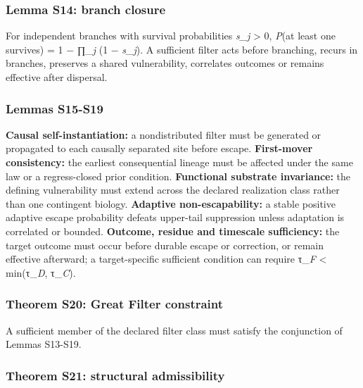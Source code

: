 \hypertarget{lemma-s14-branch-closure}{%
\subsubsection{Lemma S14: branch
closure}\label{lemma-s14-branch-closure}}

For independent branches with survival probabilities \emph{s\_j}
\textgreater{} 0, \emph{P}(at least one survives) = 1 − ∏\_\emph{j} (1 −
\emph{s\_j}). A sufficient filter acts before branching, recurs in
branches, preserves a shared vulnerability, correlates outcomes or
remains effective after dispersal.

\hypertarget{lemmas-s15-s19}{%
\subsubsection{Lemmas S15-S19}\label{lemmas-s15-s19}}

\textbf{Causal self-instantiation:} a nondistributed filter must be
generated or propagated to each causally separated site before escape.
\textbf{First-mover consistency:} the earliest consequential lineage
must be affected under the same law or a regress-closed prior condition.
\textbf{Functional substrate invariance:} the defining vulnerability
must extend across the declared realization class rather than one
contingent biology. \textbf{Adaptive non-escapability:} a stable
positive adaptive escape probability defeats upper-tail suppression
unless adaptation is correlated or bounded. \textbf{Outcome, residue and
timescale sufficiency:} the target outcome must occur before durable
escape or correction, or remain effective afterward; a target-specific
sufficient condition can require τ\_\emph{F} \textless{}
min(τ\_\emph{D}, τ\_\emph{C}).

\hypertarget{theorem-s20-great-filter-constraint}{%
\subsubsection{Theorem S20: Great Filter
constraint}\label{theorem-s20-great-filter-constraint}}

A sufficient member of the declared filter class must satisfy the
conjunction of Lemmas S13-S19.

\hypertarget{theorem-s21-structural-admissibility}{%
\subsubsection{Theorem S21: structural
admissibility}\label{theorem-s21-structural-admissibility}}

